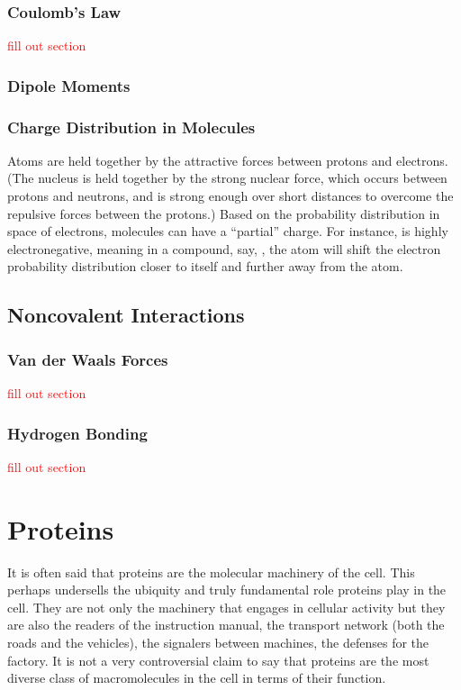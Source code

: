 \subsubsection{Coulomb's Law}

\textcolor{red}{fill out section}

\subsubsection{Dipole Moments}



\subsubsection{Charge Distribution in Molecules}

Atoms are held together by the attractive forces between protons and electrons. (The nucleus is held together by the strong nuclear force, which occurs between protons and neutrons, and is strong enough over short distances to overcome the repulsive forces between the protons.) Based on the probability distribution in space of electrons, molecules can have a ``partial'' charge. For instance,  is highly electronegative, meaning in a compound, say, , the  atom will shift the electron probability distribution closer to itself and further away from the  atom. 

\subsection{Noncovalent Interactions}
\subsubsection{Van der Waals Forces}

\textcolor{red}{fill out section}

\subsubsection{Hydrogen Bonding}

\textcolor{red}{fill out section}

\section{Proteins}

It is often said that proteins are the molecular machinery of the cell. This perhaps undersells the ubiquity and truly fundamental role proteins play in the cell. They are not only the machinery that engages in cellular activity but they are also the readers of the instruction manual, the transport network (both the roads and the vehicles), the signalers between machines, the defenses for the factory. It is not a very controversial claim to say that proteins are the most diverse class of macromolecules in the cell in terms of their function.

